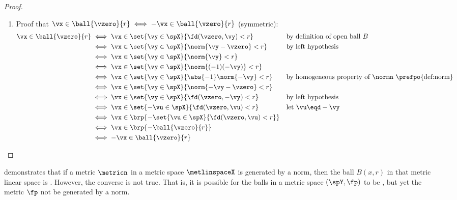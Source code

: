 \begin{proof}
\begin{enumerate}
  \item Proof that $\vx\in \ball{\vzero}{r} \iff -\vx\in \ball{\vzero}{r}$ (symmetric):
        \begin{align*}
          \vx\in \ball{\vzero}{r}
            &\iff \vx\in\set{\vy\in\spX}{\fd(\vzero,\vy)<r}
            &&    \text{by definition of open ball $B$}
          \\&\iff \vx\in\set{\vy\in\spX}{\norm{\vy-\vzero}<r}
            &&    \text{by left hypothesis}
          \\&\iff \vx\in\set{\vy\in\spX}{\norm{\vy}<r}
          \\&\iff \vx\in\set{\vy\in\spX}{\norm{(-1)(-\vy)}<r}
          \\&\iff \vx\in\set{\vy\in\spX}{\abs{-1}\norm{-\vy}<r}
            &&    \text{by homogeneous property of $\normn$ \prefpo{def:norm}}
          \\&\iff \vx\in\set{\vy\in\spX}{\norm{-\vy-\vzero}<r}
          \\&\iff \vx\in\set{\vy\in\spX}{\fd(\vzero,-\vy)<r}
            &&    \text{by left hypothesis}
          \\&\iff \vx\in\set{-\vu\in\spX}{\fd(\vzero,\vu)<r}
            &&    \text{let $\vu\eqd -\vy$}
          \\&\iff \vx\in \brp{-\set{\vu\in\spX}{\fd(\vzero,\vu)<r}}
          \\&\iff \vx\in \brp{-\ball{\vzero}{r}}
          \\&\iff -\vx\in \ball{\vzero}{r}
        \end{align*}
\end{enumerate}
\end{proof}


 demonstrates that if a metric $\metricn$ in a metric space $\metlinspaceX$
is generated by a norm,
then the ball $B(x,r)$ in that metric linear space is .
However, the converse is not true.
That is, it is possible for the balls in a metric space $(\spY,\fp)$ to be ,
but yet the metric $\fp$ not be generated by a norm.




